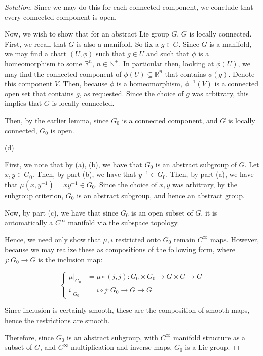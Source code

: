 \documentclass[10pt]{article}
\begin{document}
\begin{proof}[Solution]
Since we may do this for each connected component, we conclude that every connected component is open.

Now, we wish to show that for an abstract Lie group $G$, $G$ is locally connected. First, we recall that $G$ is also a manifold. So fix a $g \in G$. Since $G$ is a manifold, we may find a chart $(U, \phi)$ such that $g \in U$ and such that $\phi$ is a homeomorphism to some $\mathbb{R}^n$, $n \in \mathbb{N}^+$. In particular then, looking at $\phi(U)$, we may find the connected component of $\phi(U) \subseteq \mathbb{R}^n$ that contains $\phi(g)$. Denote this component $V$. Then, because $\phi$ is a homeomorphism, $\phi^{-1}(V)$ is a connected open set that contains $g$, as requested. Since the choice of $g$ was arbitrary, this implies that $G$ is locally connected.

Then, by the earlier lemma, since $G_0$ is a connected component, and $G$ is locally connected, $G_0$ is open.

(d)

First, we note that by (a), (b), we have that $G_0$ is an abstract subgroup of $G$. Let $x, y \in G_0$. Then, by part (b), we have that $y^{-1} \in G_0$. Then, by part (a), we have that $\mu(x, y^{-1}) = xy^{-1} \in G_0$. Since the choice of $x, y$ was arbitrary, by the subgroup criterion, $G_0$ is an abstract subgroup, and hence an abstract group.

Now, by part (c), we have that since $G_0$ is an open subset of $G$, it is automatically a $C^\infty$ manifold via the subspace topology.

Hence, we need only show that $\mu, i$ restricted onto $G_0$ remain $C^\infty$ maps. However, because we may realize these as compositions of the following form, where $j: G_0 \to G$ is the inclusion map:

$$\begin{cases} \mu\big|_{G_0} & = \mu \circ (j, j):  G_0 \times G_0 \to G \times G \to G \\ i\big|_{G_0} & = i \circ j: G_0 \to G \to G \end{cases} $$

Since inclusion is certainly smooth, these are the composition of smooth maps, hence the restrictions are smooth.

Therefore, since $G_0$ is an abstract subgroup, with $C^\infty$ manifold structure as a subset of $G$, and $C^\infty$ multiplication and inverse maps, $G_0$ is a Lie group.


\end{proof}
\end{document}
